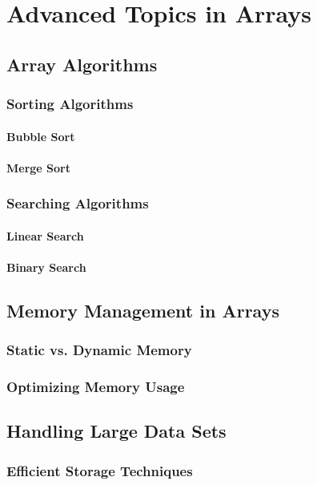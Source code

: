 \documentclass{book}
\begin{document}
	\chapter{Advanced Topics in Arrays}
	\section{Array Algorithms}
	\subsection{Sorting Algorithms}
	\subsubsection{Bubble Sort}
	\subsubsection{Merge Sort}
	\subsection{Searching Algorithms}
	\subsubsection{Linear Search}
	\subsubsection{Binary Search}
	
	\section{Memory Management in Arrays}
	\subsection{Static vs. Dynamic Memory}
	\subsection{Optimizing Memory Usage}
	
	\section{Handling Large Data Sets}
	\subsection{Efficient Storage Techniques}
\end{document}
